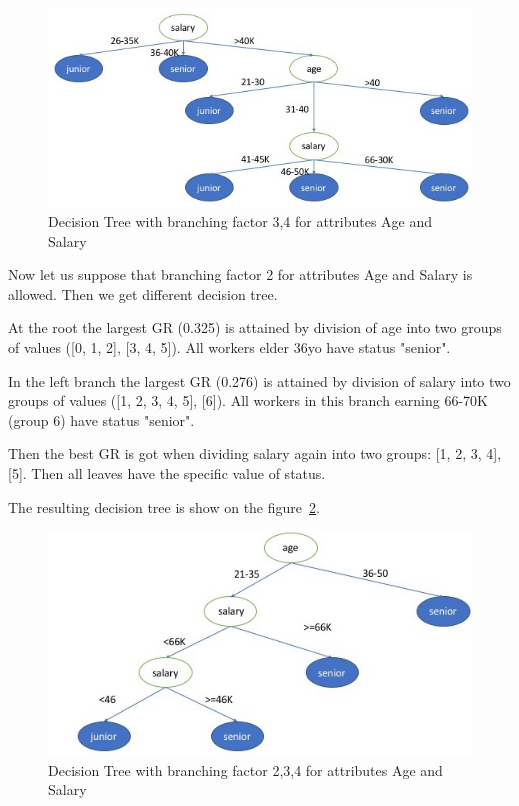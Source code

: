 \documentclass{article}
\begin{document}
\begin{figure}
\includegraphics[width=\textwidth]{DT1}
\caption{Decision Tree with branching factor 3,4 for attributes Age and Salary}
\label{DT1}
\end{figure}

Now let us suppose that branching factor 2 for attributes Age and Salary is allowed. Then we get different decision tree.

At the root the largest GR (0.325) is attained by division of age into two groups of values ([0, 1, 2], [3, 4, 5]). All workers elder 36yo have status "senior".

In the left branch the largest GR (0.276) is attained by division of salary into two groups of values ([1, 2, 3, 4, 5], [6]). All workers in this branch earning 66-70K (group 6) have status "senior".

Then the best GR is got when dividing salary again into two groups: [1, 2, 3, 4], [5]. Then all leaves have the specific value of status. 


The resulting decision tree is show on the figure~\ref{DT2}.

\begin{figure}
\includegraphics[width=\textwidth]{DT2}
\caption{Decision Tree with branching factor 2,3,4 for attributes Age and Salary}
\label{DT2}
\end{figure}
\end{document}
